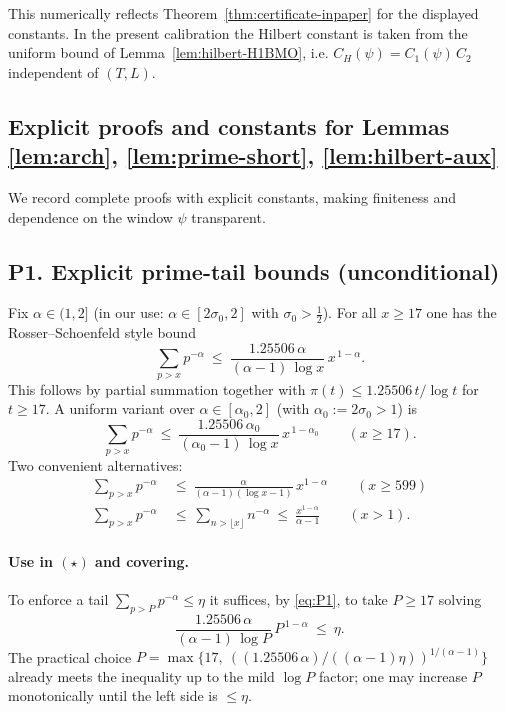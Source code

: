 \documentclass[11pt]{article}
\theoremstyle{definition}
\theoremstyle{remark}
\begin{document}
This numerically reflects Theorem~\ref{thm:certificate-inpaper} for the displayed constants. In the present calibration the Hilbert constant is taken from the uniform bound of Lemma~\ref{lem:hilbert-H1BMO}, i.e. $C_H(\psi)=C_1(\psi)\,C_2$ independent of $(T,L)$.

\subsection*{Explicit proofs and constants for Lemmas \ref{lem:arch}, \ref{lem:prime-short}, \ref{lem:hilbert-aux}}

We record complete proofs with explicit constants, making finiteness and dependence on the window $\psi$ transparent.


\subsection*{P1. Explicit prime-tail bounds (unconditional)}\label{subsec:prime-tail}
Fix $\alpha\in(1,2]$ (in our use: $\alpha\in[2\sigma_0,2]$ with $\sigma_0>\tfrac12$). For all $x\ge 17$ one has the Rosser--Schoenfeld style bound
\begin{equation}\label{eq:P1}
 \sum_{p>x} p^{-\alpha}\ \le\ \frac{1.25506\,\alpha}{(\alpha-1)\,\log x}\,x^{\,1-\alpha}.
\end{equation}
This follows by partial summation together with $\pi(t)\le 1.25506\,t/\log t$ for $t\ge 17$. A uniform variant over $\alpha\in[\alpha_0,2]$ (with $\alpha_0:=2\sigma_0>1$) is
\begin{equation}\label{eq:P1uniform}
 \sum_{p>x} p^{-\alpha}\ \le\ \frac{1.25506\,\alpha_0}{(\alpha_0-1)\,\log x}\,x^{\,1-\alpha_0}\qquad(x\ge 17).
\end{equation}
Two convenient alternatives:
\begin{align}
 \sum_{p>x}p^{-\alpha}&\ \le\ \frac{\alpha}{(\alpha-1)(\log x-1)}\,x^{1-\alpha}\qquad(x\ge 599)\label{eq:P1dusart}\\
 \sum_{p>x}p^{-\alpha}&\ \le\ \sum_{n>\lfloor x\rfloor}n^{-\alpha}\ \le\ \frac{x^{1-\alpha}}{\alpha-1}\qquad(x>1).\label{eq:P1triv}
\end{align}
\paragraph{Use in $(\star)$ and covering.}
To enforce a tail $\sum_{p>P}p^{-\alpha}\le \eta$ it suffices, by \eqref{eq:P1}, to take $P\ge17$ solving
\[
 \frac{1.25506\,\alpha}{(\alpha-1)\,\log P}\,P^{\,1-\alpha}\ \le\ \eta.
\]
The practical choice $P=\max\{17,\ ((1.25506\,\alpha)/((\alpha-1)\eta))^{1/(\alpha-1)}\}$ already meets the inequality up to the mild $\log P$ factor; one may increase $P$ monotonically until the left side is $\le\eta$.
\end{document}
